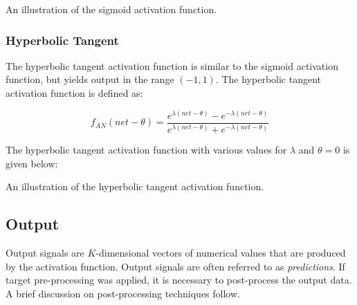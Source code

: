 \begin{graph}[H]
    \centering
    \resizebox{0.8\textwidth}{!}{}
    \caption[The sigmoid activation
    function]{An illustration of the sigmoid activation function.}
    \label{grf:sigmoid}
\end{graph}


\subsubsection{Hyperbolic Tangent}
\label{sec:anns:an:act_functions:tanh}

The hyperbolic tangent activation function is similar to the sigmoid
activation function, but yields output in the range
$(-1, 1)$. The hyperbolic tangent
activation function is defined as:
	
\begin{equation}
    f_{AN}(net - \theta) = \frac{e^{\lambda(net - \theta)}-e^{-\lambda(net - \theta)}}{e^{\lambda(net - \theta)}+e^{-\lambda(net - \theta)}}
    \label{eq:hyperbolic_tangent}
\end{equation}

\noindent The hyperbolic tangent activation function with various values for $\lambda$ and $\theta = 0$
is given below:

\begin{graph}[H]
    \centering
    \resizebox{0.8\textwidth}{!}{}
    \vspace{10pt}
    \caption[The hyperbolic tangent activation function]{An illustration of the hyperbolic tangent activation function.}
    \label{grf:hyperbolic_tangent}
\end{graph}


\subsection{Output}
\label{sec:anns:an:output}

Output signals are $K$-dimensional vectors of numerical values that are produced
by the activation function. Output signals are often
referred to as \textit{predictions}. If target pre-processing was applied, it is
necessary to post-process the output data. A brief discussion on post-processing
techniques follow.

